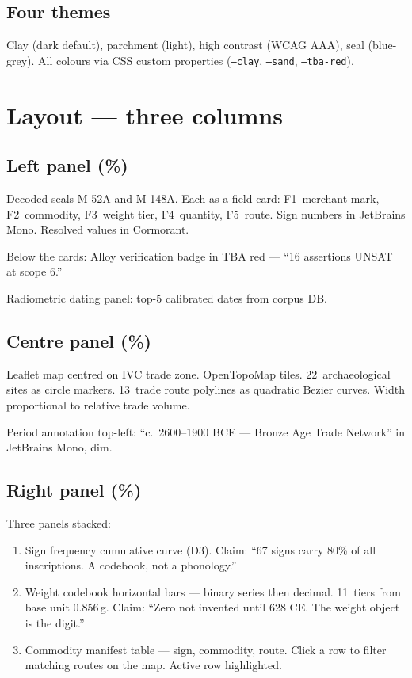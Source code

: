 \documentclass[11pt]{article}
\begin{document}
\subsection{Four themes}

Clay (dark default), parchment (light), high contrast
(WCAG AAA), seal (blue-grey). All colours via CSS custom
properties (\texttt{--clay}, \texttt{--sand}, \texttt{--tba-red}).

\section{Layout --- three columns}

\subsection{Left panel (\%)}

Decoded seals M-52A and M-148A. Each as a field card:
F1~merchant mark, F2~commodity, F3~weight tier, F4~quantity,
F5~route. Sign numbers in JetBrains Mono. Resolved values
in Cormorant.

Below the cards: Alloy verification badge in TBA red ---
``16 assertions UNSAT at scope 6.''

Radiometric dating panel: top-5 calibrated dates from corpus DB.

\subsection{Centre panel (\%)}

Leaflet map centred on IVC trade zone. OpenTopoMap tiles.
22~archaeological sites as circle markers. 13~trade route
polylines as quadratic Bezier curves. Width proportional to
relative trade volume.

Period annotation top-left: ``c.\ 2600--1900 BCE --- Bronze
Age Trade Network'' in JetBrains Mono, dim.

\subsection{Right panel (\%)}

Three panels stacked:

\begin{enumerate}[nosep]
\item Sign frequency cumulative curve (D3). Claim: ``67 signs
  carry 80\% of all inscriptions. A codebook, not a phonology.''
\item Weight codebook horizontal bars --- binary series then
  decimal. 11~tiers from base unit 0.856\,g. Claim: ``Zero not
  invented until 628 CE. The weight object is the digit.''
\item Commodity manifest table --- sign, commodity, route.
  Click a row to filter matching routes on the map. Active
  row highlighted.
\end{enumerate}
\end{document}
